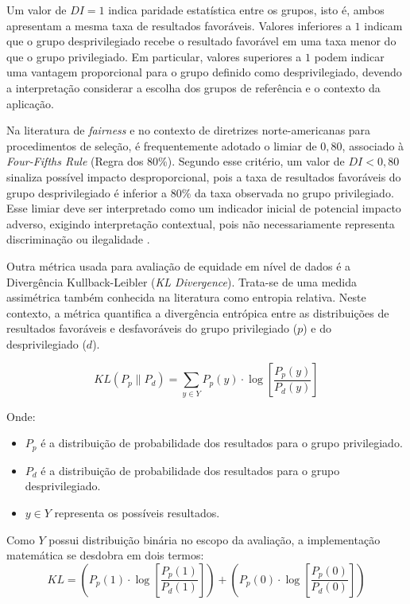 Um valor de $DI=1$ indica paridade estatística entre os grupos, isto é, ambos apresentam a mesma taxa de resultados favoráveis. Valores inferiores a $1$ indicam que o grupo desprivilegiado recebe o resultado favorável em uma taxa menor do que o grupo privilegiado. Em particular, valores superiores a $1$ podem indicar uma vantagem proporcional para o grupo definido como desprivilegiado, devendo a interpretação considerar a escolha dos grupos de referência e o contexto da aplicação.

Na literatura de \textit{fairness} e no contexto de diretrizes norte-americanas para procedimentos de seleção, é frequentemente adotado o limiar de $0{,}80$, associado à \textit{Four-Fifths Rule} (Regra dos 80\%). Segundo esse critério, um valor de $DI < 0{,}80$ sinaliza possível impacto desproporcional, pois a taxa de resultados favoráveis do grupo desprivilegiado é inferior a 80\% da taxa observada no grupo privilegiado. Esse limiar deve ser interpretado como um indicador inicial de potencial impacto adverso, exigindo interpretação contextual, pois não necessariamente representa discriminação ou ilegalidade \cite{feldman2015certifying}.

Outra métrica usada para avaliação de equidade em nível de dados é a Divergência Kullback-Leibler (\textit{KL Divergence}). Trata-se de uma medida assimétrica também conhecida na literatura como entropia relativa. Neste contexto, a métrica quantifica a divergência entrópica entre as distribuições de resultados favoráveis e desfavoráveis do grupo privilegiado ($p$) e do desprivilegiado ($d$).

\begin{equation}
    KL(P_p \parallel P_d) = \sum_{y \in Y} P_p(y) \cdot \log\left[ \frac{P_p(y)}{P_d(y)} \right]
\end{equation}

\noindent Onde:
\begin{itemize}
    \item $P_p$ é a distribuição de probabilidade dos resultados para o grupo privilegiado.
    \item $P_d$ é a distribuição de probabilidade dos resultados para o grupo desprivilegiado.
    \item $y \in Y$ representa os possíveis resultados.
\end{itemize}

\noindent Como $Y$ possui distribuição binária no escopo da avaliação, a implementação matemática se desdobra em dois termos:
\begin{equation}
    KL = \left( P_p(1) \cdot \log\left[ \frac{P_p(1)}{P_d(1)} \right] \right) + \left( P_p(0) \cdot \log\left[ \frac{P_p(0)}{P_d(0)} \right] \right)
\end{equation}

